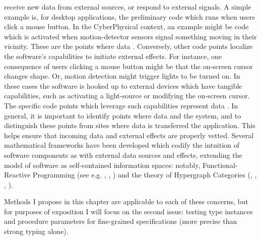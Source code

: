 {\begin{enumerate}
receive new data from external sources, or respond to 
external signals.  A simple example is, for desktop applications, 
the preliminary code which runs when users click a mouse button.  
In the CyberPhysical context, an example might be code which 
is activated when motion-detector sensors signal something moving 
in their vicinity.  These are the  points where data 
.
\pseudoIndent{}
Conversely, other code points localize 
the software's capabilities to initiate external effects.  For 
instance, one consequence of users clicking a mouse button might 
be that the on-screen cursor changes shape.  Or, motion detection 
might trigger lights to be turned on.  In these cases the software 
is hooked up to external devices which have tangible capabilities, 
such as activating a light-source or modifying the on-screen cursor.  
The specific code points which leverage such capabilities 
represent data .  
\pseudoIndent{}
In general, it is important to identify points where data 
 and  the system, and to distinguish 
these points from sites where data is transferred 
 the application.  This helps ensure that 
incoming data and external effects are properly vetted.  
Several mathematical frameworks have been developed 
which codify the intuition of software components as 
 with external data sources and effects, 
extending the model of software as self-contained 
information spaces: notably, Functional-Reactive Programming 
(see e.g. \cite{JenniferPaykin}, 
\cite{PaykinKrishnaswami}, 
\cite{WolfgangJeltsch}) and the theory of 
Hypergraph Categories 
(\cite{InteractingConceptualSpaces}, \cite{BrendanFong}, 
\cite{BrendanFongThesis}, \cite{AleksKissinger}). 
\end{enumerate}
Methods I propose in this chapter are applicable to each 
of these concerns, but for purposes of exposition I 
will focus on the second issue: testing 
type instances and procedure parameters for fine-grained 
specifications (more precise than strong typing alone). 
}
